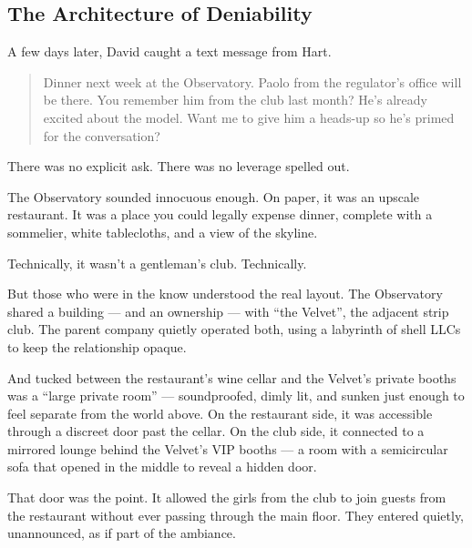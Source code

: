 
\subsection{The Architecture of Deniability}

A few days later, David caught a text message from Hart.

\begin{quote}
  Dinner next week at the Observatory. Paolo from the regulator’s office will be there. You remember him from the club 
  last month? He’s already excited about the model. Want me to give him a heads-up so he’s primed for the conversation?
\end{quote}

There was no explicit ask. There was no leverage spelled out.

The Observatory sounded innocuous enough. On paper, it was an upscale restaurant. It was a place you could legally expense 
dinner, complete with a sommelier, white tablecloths, and a view of the skyline.  

Technically, it wasn’t a gentleman’s club. Technically.

But those who were in the know understood the real layout. The Observatory shared a building --- and an ownership --- with 
``the Velvet'', the adjacent strip club. The parent company quietly operated both, using a labyrinth of shell 
LLCs to keep the relationship opaque.

And tucked between the restaurant’s wine cellar and the Velvet’s private booths was a “large private room” — soundproofed, 
dimly lit, and sunken just enough to feel separate from the world above. On the restaurant side, it was accessible through 
a discreet door past the cellar. On the club side, it connected to a mirrored lounge behind the Velvet’s VIP booths — a 
room with a semicircular sofa that opened in the middle to reveal a hidden door.

That door was the point. It allowed the girls from the club to join guests from the restaurant without ever passing through 
the main floor. They entered quietly, unannounced, as if part of the ambiance. 

\medskip

